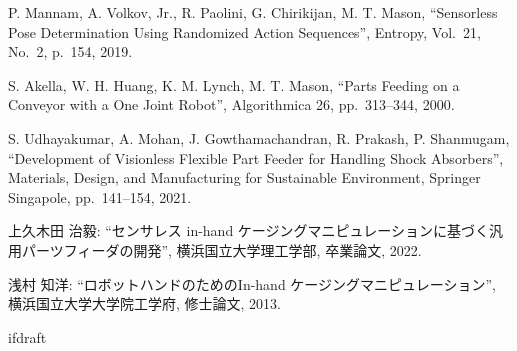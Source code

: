 \documentclass[a4paper,twoside,12pt,papersize, dvipdfmx]{iirthesis}
\begin{document}
\begin{thebibliography}{}
  	P. Mannam, A. Volkov, Jr., R. Paolini, G. Chirikijan, M. T. Mason,
  	``Sensorless Pose Determination Using Randomized Action Sequences'',
  	 Entropy, Vol.~21, No.~2, p.~154, 
  	2019.
  	
  	S. Akella, W. H. Huang, K. M. Lynch, M. T. Mason,
  	``Parts Feeding on a Conveyor with a One Joint Robot'',
  	 Algorithmica 26,
  	 pp.~313--344,
  	2000.
  	
  	S. Udhayakumar, A. Mohan, J. Gowthamachandran,  R. Prakash, P. Shanmugam,
  	``Development of Visionless Flexible Part Feeder for Handling Shock Absorbers'',
  	 Materials, Design, and Manufacturing for Sustainable Environment, Springer Singapole, 
  	 pp.~141--154,
  	2021.  	
  	
上久木田 治毅:
``センサレス in-hand ケージングマニピュレーションに基づく汎用パーツフィーダの開発'', 
横浜国立大学理工学部, 卒業論文, 2022.
  	
浅村 知洋:
``ロボットハンドのためのIn-hand ケージングマニピュレーション'', 
横浜国立大学大学院工学府, 修士論文, 2013.
\end{thebibliography}

\expandafter\ifx\csname ifdraft\endcsname\relax
    
\end{document}
